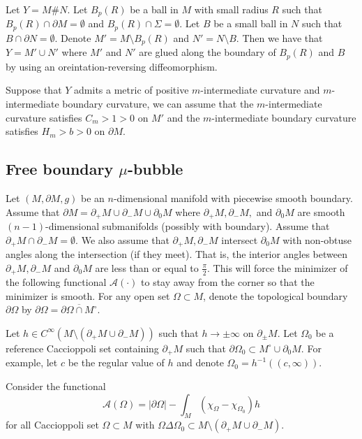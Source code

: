 \documentclass[11pt,letterpaper]{amsart}
\theoremstyle{definition}
\theoremstyle{remark}
\numberwithin{equation}{section}
\begin{document}
Let $Y=M\# N$. Let $B_p(R)$ be a ball in $M$ with small radius $R$  such that $B_p(R)\cap \partial M =\emptyset$ and $B_p(R)\cap \Sigma=\emptyset$. Let $B$ be a small ball in $N$ such that $B\cap \partial N=\emptyset$. Denote $M'=M\setminus B_p(R)$ and $N'=N\setminus B$. Then we have that $Y=M'\cup N'$ where $M'$ and $N'$ are glued along the boundary of $B_p(R)$ and $B$ by using an oreintation-reversing diffeomorphism. 

Suppose that $Y$ admits a metric of positive $m$-intermediate curvature and $m$-intermediate boundary curvature, we can assume that the $m$-intermediate curvature satisfies $C_m>1>0$ on $M'$ and the $m$-intermediate boundary curvature satisfies $H_m>b>0$ on $\partial M.$ 



\subsection{Free boundary $\mu$-bubble}
Let $(M,\partial M,g)$ be an $n$-dimensional manifold with piecewise smooth boundary. Assume that $\partial M=\partial_+M\cup \partial_{-}M\cup \partial_0M$ where $\partial_+ M,\partial_{-}M,$ and $\partial_0M$ are smooth $(n-1)$-dimensional submanifolds (possibly with boundary). Assume that $\partial_+M\cap\partial_-M=\emptyset.$ We also assume that $\partial_+M,\partial_-M$ intersect $\partial_0M$ with non-obtuse angles along the intersection (if they meet). That is, the interior angles between $\partial_+M, \partial_{-}M$ and $\partial_0M$ are less than or equal to $\frac{\pi}{2}$. This will force the minimizer of the following functional $\mathcal{A}(\cdot)$ to stay away from the corner so that the minimizer is smooth. For any open set $\Omega\subset M$, denote the topological boundary $\partial\Omega$ by $\partial\Omega=\overline{\partial \Omega\cap M^\circ}.$

Let $h\in C^{\infty}(M\setminus (\partial_+M\cup \partial_-M))$ such that $h\rightarrow \pm\infty$ on $\partial_{\pm}M$. Let $\Omega_0$ be a reference Caccioppoli set containing $\partial_+M$ such that $\partial\Omega_0\subset M^\circ\cup \partial_0M.$ For example, let $c$ be the regular value of $h$ and denote $\Omega_0=h^{-1}((c,\infty)).$

Consider the functional
\[\mathcal{A}(\Omega)=|\partial\Omega|-\int_M(\chi_\Omega-\chi_{\Omega_0})h\]
for all Caccioppoli set $\Omega\subset M$ with $\Omega\Delta\Omega_0\subset M\setminus(\partial_+M\cup \partial_-M).$
\end{document}
